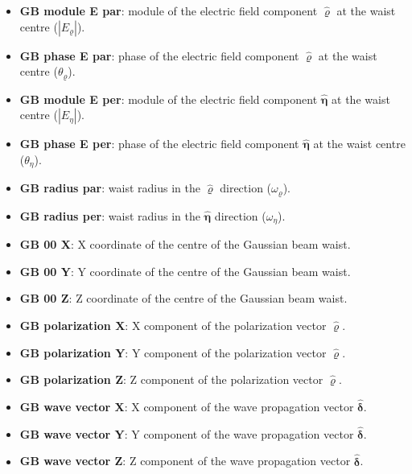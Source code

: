 \begin{itemize}\itemsep-0.5em 
	\item \textbf{GB module E par}: module of the electric field component $\mathbf{\hat{\varrho}}$ at the waist centre ($|E_{\varrho}|$).
	\item \textbf{GB phase E par}: phase of the electric field component $\mathbf{\hat{\varrho}}$ at the waist centre ($\theta_{\varrho}$).
	\\
	\item \textbf{GB module E per}: module of the electric field component $\mathbf{\hat{\eta}}$ at the waist centre ($|E_{\eta}|$).
	\item \textbf{GB phase E per}: phase of the electric field component $\mathbf{\hat{\eta}}$ at the waist centre ($\theta_{\eta}$).
	\\
	\item \textbf{GB radius par}: waist radius in the $\mathbf{\hat{\varrho}}$ direction ($\omega_{\varrho}$).
	\item \textbf{GB radius per}: waist radius in the $\mathbf{\hat{\eta}}$ direction ($\omega_{\eta}$).
	\\
	\item \textbf{GB 00 X}: X coordinate of the centre of the Gaussian beam waist.
	\item \textbf{GB 00 Y}: Y coordinate of the centre of the Gaussian beam waist.
	\item \textbf{GB 00 Z}: Z coordinate of the centre of the Gaussian beam waist.
	\\
	\item \textbf{GB polarization X}: X component of the polarization vector $\mathbf{\hat{\varrho}}$.
	\item \textbf{GB polarization Y}: Y component of the polarization vector $\mathbf{\hat{\varrho}}$.
	\item \textbf{GB polarization Z}: Z component of the polarization vector $\mathbf{\hat{\varrho}}$.
	\\
	\item \textbf{GB wave vector X}: X component of the wave propagation vector $\mathbf{\hat{\delta}}$.
    \item \textbf{GB wave vector Y}: Y component of the wave propagation vector $\mathbf{\hat{\delta}}$.
    \item \textbf{GB wave vector Z}: Z component of the wave propagation vector $\mathbf{\hat{\delta}}$.
\end{itemize}
